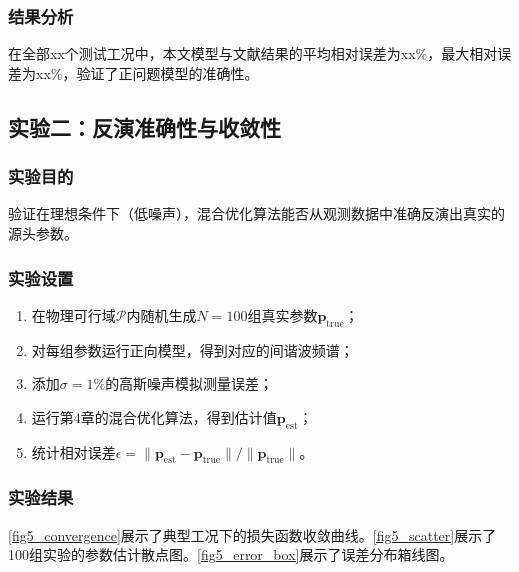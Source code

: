 \documentclass[withoutpreface,bwprint]{cumcmthesis}
\begin{document}

\subsubsection{结果分析}

在全部xx个测试工况中，本文模型与文献结果的平均相对误差为xx\%，最大相对误差为xx\%，验证了正问题模型的准确性。

\subsection{实验二：反演准确性与收敛性}

\subsubsection{实验目的}

验证在理想条件下（低噪声），混合优化算法能否从观测数据中准确反演出真实的源头参数。

\subsubsection{实验设置}

\begin{enumerate}
\item 在物理可行域$\mathcal{P}$内随机生成$N=100$组真实参数$\mathbf{p}_{\mathrm{true}}$；
\item 对每组参数运行正向模型，得到对应的间谐波频谱；
\item 添加$\sigma=1\%$的高斯噪声模拟测量误差；
\item 运行第4章的混合优化算法，得到估计值$\mathbf{p}_{\mathrm{est}}$；
\item 统计相对误差$\epsilon=\|\mathbf{p}_{\mathrm{est}}-\mathbf{p}_{\mathrm{true}}\|/\|\mathbf{p}_{\mathrm{true}}\|$。
\end{enumerate}

\subsubsection{实验结果}

\cref{fig5_convergence}展示了典型工况下的损失函数收敛曲线。\cref{fig5_scatter}展示了100组实验的参数估计散点图。\cref{fig5_error_box}展示了误差分布箱线图。
\end{document}

